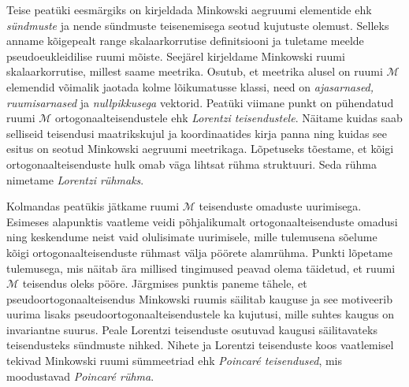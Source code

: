 \documentclass[12pt,a4paper,oneside]{article}
\theoremstyle{plain}
\theoremstyle{definition}
\numberwithin{equation}{section}
\def\M{{\mathcal M}}
\begin{document}
Teise peatüki eesmärgiks on kirjeldada Minkowski aegruumi 
elementide ehk \emph{sündmuste} ja nende sündmuste teisenemisega 
seotud kujutuste olemust. Selleks anname kõigepealt range 
skalaarkorrutise definitsiooni ja tuletame meelde 
pseudoeukleidilise ruumi mõiste. Seejärel kirjeldame 
Minkowski ruumi skalaar\-korrutise, millest saame meetrika. 
Osutub, et meetrika alusel on ruumi $\M$ elemendid võimalik 
jaotada kolme lõikumatusse klassi, need on \emph{ajasarnased, 
ruumisarnased} ja \emph{nullpikkusega} vektorid. 
Peatüki viimane punkt on pühendatud ruumi $\M$ 
ortogonaal\-teisendustele ehk \emph{Lorentzi 
teisendustele}. Näitame kuidas saab selliseid 
teisendusi maatrikskujul ja koordinaatides kirja panna ning 
kuidas see esitus on seotud \mbox{Minkowski} aegruumi meetrikaga. 
Lõpetuseks tõestame, et kõigi ortogonaalteisenduste hulk 
omab väga lihtsat rühma struktuuri. Seda rühma nimetame 
\emph{Lorentzi rühmaks}.

Kolmandas peatükis jätkame ruumi $\M$ teisenduste omaduste 
uurimisega. Esimeses alapunktis vaatleme veidi 
põhjalikumalt ortogonaalteisenduste omadusi ning 
keskendume neist vaid olulisimate uurimisele, mille 
tulemusena sõelume kõigi ortogonaalteisenduste rühmast välja 
pöörete alamrühma. Punkti lõpetame tulemusega, mis näitab 
ära millised tingimused peavad olema täidetud, et ruumi 
$\M$ \mbox{teisendus} oleks pööre. Järgmises punktis paneme tähele, 
et pseudoortogonaal\-teisendus \mbox{Minkowski} ruumis 
säilitab kauguse ja see motiveerib uurima lisaks 
pseudoortogonaalteisendustele ka kujutusi, mille suhtes kaugus 
on invariantne suurus. Peale Lorentzi teisenduste osutuvad 
kaugusi säilitavateks teisendusteks sündmuste nihked. Nihete 
ja Lorentzi teisenduste koos vaatlemisel tekivad Minkowski 
\mbox{ruumi} sümmeetriad ehk \emph{Poincar\'e teisendused}, mis 
moodustavad \emph{Poincar\'e rühma}.

\begin{comment}
Parem oleks kirjutada, et kaasaegses teoreetilises füüsikas üheks 
väga tähtsaks mõisteks on supersümmeetria. Supersümmeetriliste 
teooriate matemaatiliseks kirjelduseks oli arendatud geomeetria 
valdkond, mida võime nimetada supergeomeetriaks. Minkowski 
superruum on supergeomeetria tähtsaim struktuur. Üldjoontes 
Minkowski superruum on Minkowski ruumi laiend, kus neljale 
harilikule koordinadile lisatakse uued koordinaadid nn 
antikommuteeruvad koordinaadid.
\end{comment}
\end{document}
